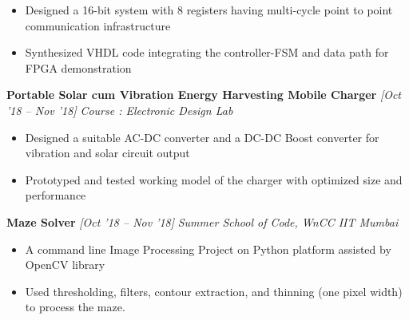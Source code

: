 \documentclass[10 pt]{article}%
\begin{document}
{{{{{{{\begin{itemize}[leftmargin=*]
\setlength\parskip{1.5pt}
		\item Designed a 16-bit system with 8 registers having multi-cycle point to point communication infrastructure
		\item Synthesized VHDL code integrating the controller-FSM and data path for FPGA demonstration
	\end{itemize}
{\flushleft \textbf {\large{Portable Solar cum Vibration Energy Harvesting Mobile Charger}} \hfill {{{\em{[Oct '18 – Nov '18]}}}}
	\vspace{-0.8em}
	{\flushleft \em{Course : Electronic Design Lab}}
	\vspace{-5pt}
	\begin{itemize}[leftmargin=*]
		\setlength\itemsep{1.5pt}
		\setlength\parskip{1.5pt}
			\item Designed a suitable AC-DC converter and a DC-DC Boost converter for vibration and solar circuit output
			\item Prototyped and tested working model of the charger with optimized size and performance
		\end{itemize}
{\flushleft \textbf {\large{Maze Solver}} \hfill {{{\em{[Oct '18 – Nov '18]}}}}
	\vspace{-0.8em}
	{\flushleft \em{Summer School of Code, WnCC IIT Mumbai}}
	\vspace{-5pt}
	\begin{itemize}[leftmargin=*]
		\setlength\itemsep{1.5pt}
		\setlength\parskip{1.5pt}
		\item A command line Image Processing Project on Python platform assisted by OpenCV library
		\item Used thresholding, filters, contour extraction, and thinning (one pixel width) to process the maze.
	\end{itemize}



}}}}}}}}}
\end{document}
